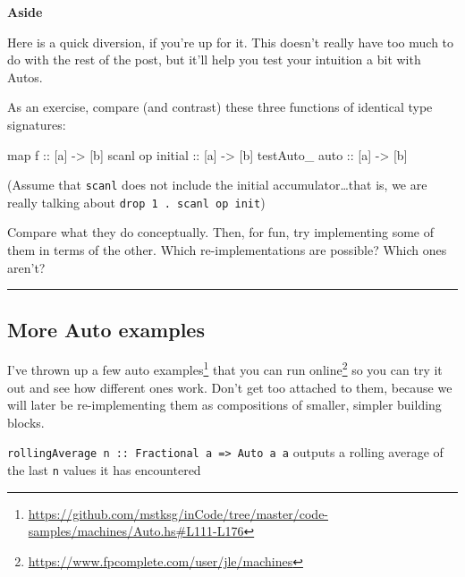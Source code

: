 \documentclass[]{article}
\newenvironment{Shaded}{}{}
\newcommand{\FunctionTok}[1]{\textcolor[rgb]{0.02,0.16,0.49}{#1}}
\newcommand{\NormalTok}[1]{#1}
\newcommand{\OtherTok}[1]{\textcolor[rgb]{0.00,0.44,0.13}{#1}}
\renewcommand{\href}[2]{#2\footnote{\url{#1}}}
\begin{document}
\textbf{Aside}

Here is a quick diversion, if you're up for it. This doesn't really have too
much to do with the rest of the post, but it'll help you test your intuition a
bit with Autos.

As an exercise, compare (and contrast) these three functions of identical type
signatures:

\begin{Shaded}
\begin{Highlighting}[]
\FunctionTok{map}\OtherTok{       f          ::}\NormalTok{ [a] }\OtherTok{{-}\textgreater{}}\NormalTok{ [b]}
\FunctionTok{scanl}\NormalTok{     op}\OtherTok{ initial ::}\NormalTok{ [a] }\OtherTok{{-}\textgreater{}}\NormalTok{ [b]}
\NormalTok{testAuto\_}\OtherTok{ auto       ::}\NormalTok{ [a] }\OtherTok{{-}\textgreater{}}\NormalTok{ [b]}
\end{Highlighting}
\end{Shaded}

(Assume that \texttt{scanl} does not include the initial accumulator\ldots that
is, we are really talking about \texttt{drop\ 1\ .\ scanl\ op\ init})

Compare what they do conceptually. Then, for fun, try implementing some of them
in terms of the other. Which re-implementations are possible? Which ones aren't?

\begin{center}\rule{0.5\linewidth}{0.5pt}\end{center}

\subsection{More Auto examples}\label{more-auto-examples}

\href{https://github.com/mstksg/inCode/tree/master/code-samples/machines/Auto.hs\#L111-L176}{I've
thrown up a few auto examples}
\href{https://www.fpcomplete.com/user/jle/machines}{that you can run online} so
you can try it out and see how different ones work. Don't get too attached to
them, because we will later be re-implementing them as compositions of smaller,
simpler building blocks.

\begin{description}
\tightlist
\item[\href{https://github.com/mstksg/inCode/tree/master/code-samples/machines/Auto.hs\#L111-L122}{rollingAverage}]
\texttt{rollingAverage\ n\ ::\ Fractional\ a\ =\textgreater{}\ Auto\ a\ a}
outputs a rolling average of the last \texttt{n} values it has encountered
\end{description}
\end{document}
